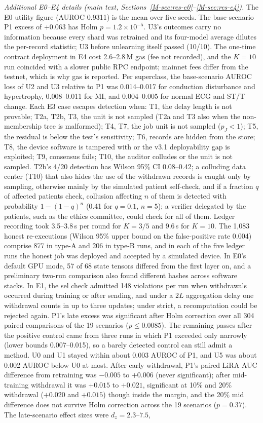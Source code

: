 \emph{Additional E0--E4 details (main text, Sections~\ref{M-sec:res-e0}--\ref{M-sec:res-e4}).} The E0 utility figure (AUROC 0.9311) is the mean over five seeds. The base-scenario P1 excess of +0.063 has Holm $p=1.2\times10^{-5}$. U3's \Lthree{} outcomes carry no information because every shard was retrained and its four-model average dilutes the per-record statistic; U3 before unlearning itself passed (10/10). The one-time contract deployment in E4 cost 2.6--2.8\,M gas (fee not recorded), and the $K=10$ run coincided with a slower public RPC endpoint; mainnet fees differ from the testnet, which is why gas is reported. Per superclass, the base-scenario AUROC loss of U2 and U3 relative to P1 was 0.014--0.017 for conduction disturbance and hypertrophy, 0.008--0.011 for MI, and 0.004--0.005 for normal ECG and ST/T change. Each E3 case escapes detection when: T1, the delay length is not provable; T2a, T2b, T3, the unit is not sampled (T2a and T3 also when the non-membership tree is malformed); T4, T7, the job unit is not sampled ($p_J<1$); T5, the residual is below the test's sensitivity; T6, records are hidden from the store; T8, the device software is tampered with or the v3.1 deployability gap is exploited; T9, consensus fails; T10, the auditor colludes or the unit is not sampled. T2b's 4/20 detection has Wilson 95\% CI 0.08--0.42; a colluding data center (T10) that also hides the use of the withdrawn records is caught only by \Lone{} sampling, otherwise mainly by the simulated patient self-check, and if a fraction $q$ of affected patients check, collusion affecting $n$ of them is detected with probability $1-(1-q)^n$ (0.41 for $q=0.1$, $n=5$); a verifier delegated by the patients, such as the ethics committee, could check for all of them. Ledger recording took 3.5--3.8\,s per round for $K=3/5$ and 9.6\,s for $K=10$. The 1,083 honest re-executions (Wilson 95\% upper bound on the false-positive rate 0.004) comprise 877 in type-A and 206 in type-B runs, and in each of the five ledger runs the honest job was deployed and accepted by a simulated device. In E0's default GPU mode, 57 of 68 state tensors differed from the first layer on, and a preliminary two-run comparison also found different hashes across software stacks. In E1, the sel check admitted 148 violations per run when withdrawals occurred during training or after sending, and under a $2L$ aggregation delay one withdrawal counts in up to three updates; under strict, a recomputation could be rejected again. P1's late excess was significant after Holm correction over all 304 paired comparisons of the 19 scenarios ($p\le0.0085$). The remaining passes after the positive control came from three runs in which P1 exceeded only narrowly (lower bounds 0.007--0.015), so a barely detected control can still admit a method. U0 and U1 stayed within about 0.003 AUROC of P1, and U5 was about 0.002 AUROC below U0 at most. After early withdrawal, P1's paired LiRA AUC difference from retraining was $-0.005$ to $+0.006$ (never significant); after mid-training withdrawal it was $+0.015$ to $+0.021$, significant at 10\% and 20\% withdrawal ($+0.020$ and $+0.015$) though inside the margin, and the 20\% mid difference does not survive Holm correction across the 19 scenarios ($p=0.37$). The late-scenario effect sizes were $d_z=2.3$--$7.5$, 